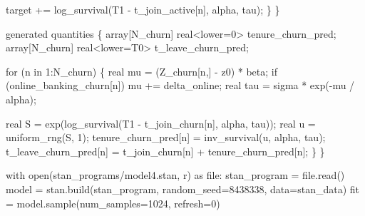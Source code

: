 \documentclass[
  letterpaper,
  DIV=11,
  numbers=noendperiod]{scrartcl}
\newenvironment{Shaded}{\begin{snugshade}}{\end{snugshade}}
\newcommand{\BuiltInTok}[1]{\textcolor[rgb]{0.00,0.23,0.31}{#1}}
\newcommand{\ControlFlowTok}[1]{\textcolor[rgb]{0.00,0.23,0.31}{#1}}
\newcommand{\DataTypeTok}[1]{\textcolor[rgb]{0.68,0.00,0.00}{#1}}
\newcommand{\DecValTok}[1]{\textcolor[rgb]{0.68,0.00,0.00}{#1}}
\newcommand{\ImportTok}[1]{\textcolor[rgb]{0.00,0.46,0.62}{#1}}
\newcommand{\KeywordTok}[1]{\textcolor[rgb]{0.00,0.23,0.31}{#1}}
\newcommand{\NormalTok}[1]{\textcolor[rgb]{0.00,0.23,0.31}{#1}}
\newcommand{\OperatorTok}[1]{\textcolor[rgb]{0.37,0.37,0.37}{#1}}
\newcommand{\StringTok}[1]{\textcolor[rgb]{0.13,0.47,0.30}{#1}}
\begin{document}
\begin{codelisting}
\begin{Shaded}
\begin{Highlighting}[]
    \KeywordTok{target +=}\NormalTok{ log\_survival(T1 {-} t\_join\_active[n], alpha, tau);}
\NormalTok{  \}}
\NormalTok{\}}

\KeywordTok{generated quantities}\NormalTok{ \{}
  \DataTypeTok{array}\NormalTok{[N\_churn] }\DataTypeTok{real}\NormalTok{\textless{}}\KeywordTok{lower}\NormalTok{=}\DecValTok{0}\NormalTok{\textgreater{} tenure\_churn\_pred;}
  \DataTypeTok{array}\NormalTok{[N\_churn] }\DataTypeTok{real}\NormalTok{\textless{}}\KeywordTok{lower}\NormalTok{=T0\textgreater{} t\_leave\_churn\_pred;}

  \ControlFlowTok{for}\NormalTok{ (n }\ControlFlowTok{in} \DecValTok{1}\NormalTok{:N\_churn) \{}
    \DataTypeTok{real}\NormalTok{ mu = (Z\_churn[n,] {-} z0) * beta;}
    \ControlFlowTok{if}\NormalTok{ (online\_banking\_churn[n])}
\NormalTok{      mu += delta\_online;}
    \DataTypeTok{real}\NormalTok{ tau = sigma * exp({-}mu / alpha);}

    \DataTypeTok{real}\NormalTok{ S = exp(log\_survival(T1 {-} t\_join\_churn[n],}
\NormalTok{                              alpha, tau));}
    \DataTypeTok{real}\NormalTok{ u = uniform\_rng(S, }\DecValTok{1}\NormalTok{);}
\NormalTok{    tenure\_churn\_pred[n]}
\NormalTok{      = inv\_survival(u, alpha, tau);}
\NormalTok{    t\_leave\_churn\_pred[n]}
\NormalTok{      = t\_join\_churn[n] + tenure\_churn\_pred[n];}
\NormalTok{  \}}
\NormalTok{\}}
\end{Highlighting}
\end{Shaded}

\end{codelisting}

\begin{Shaded}
\begin{Highlighting}[]
\ControlFlowTok{with} \BuiltInTok{open}\NormalTok{(}\StringTok{\textquotesingle{}stan\_programs/model4.stan\textquotesingle{}}\NormalTok{, }\StringTok{\textquotesingle{}r\textquotesingle{}}\NormalTok{) }\ImportTok{as} \BuiltInTok{file}\NormalTok{:}
\NormalTok{  stan\_program }\OperatorTok{=} \BuiltInTok{file}\NormalTok{.read()}
\NormalTok{model }\OperatorTok{=}\NormalTok{ stan.build(stan\_program,}
\NormalTok{                   random\_seed}\OperatorTok{=}\DecValTok{8438338}\NormalTok{,}
\NormalTok{                   data}\OperatorTok{=}\NormalTok{stan\_data)}
\NormalTok{fit }\OperatorTok{=}\NormalTok{ model.sample(num\_samples}\OperatorTok{=}\DecValTok{1024}\NormalTok{, refresh}\OperatorTok{=}\DecValTok{0}\NormalTok{)}
\end{Highlighting}
\end{Shaded}
\end{document}
